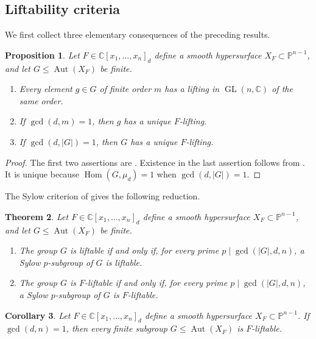\documentclass[12pt]{amsart}
\numberwithin{equation}{section}
\theoremstyle{plain}
\newtheorem{thm}{Theorem}[section]
\newtheorem{prop}[thm]{Proposition}
\newtheorem{cor}[thm]{Corollary}
\theoremstyle{definition}
\theoremstyle{remark}
\newcommand{\CC}{\mathbb C}
\newcommand{\PP}{\mathbb P}
\DeclareMathOperator{\Aut}{Aut}
\DeclareMathOperator{\GL}{GL}
\DeclareMathOperator{\Hom}{Hom}
\begin{document}
\subsection{Liftability criteria}

We first collect three elementary consequences of the preceding results.

\begin{prop}\label{prop:basic-liftability}
Let $F\in\CC[x_1,\ldots,x_n]_d$ define a smooth hypersurface
$X_F\subset\PP^{n-1}$, and let $G\leq\Aut(X_F)$ be finite.
\begin{enumerate}
    \item Every element $g\in G$ of finite order $m$ has a lifting in
    $\GL(n,\CC)$ of the same order.

    \item If $\gcd(d,m)=1$, then $g$ has a unique $F$-lifting.

    \item If $\gcd(d,|G|)=1$, then $G$ has a unique $F$-lifting.
\end{enumerate}
\end{prop}

\begin{proof}
The first two assertions are \cite[Lemma~4.1 and
Proposition~4.7]{xiezhenglift}.  Existence in the last assertion follows
from \cite[Theorem~1.3]{xiezhenglift}.  It is unique because
$\Hom(G,\mu_d)=1$ when $\gcd(d,|G|)=1$.
\end{proof}

The Sylow criterion of \cite[Theorem~1.1(2) and Theorem~1.3]{xiezhenglift} gives the following
reduction.

\begin{thm}
\label{thm:sylow-liftability}
Let $F\in\CC[x_1,\ldots,x_n]_d$ define a smooth hypersurface
$X_F\subset\PP^{n-1}$, and let $G\leq\Aut(X_F)$ be finite.
\begin{enumerate}
    \item The group $G$ is liftable if and only if, for every prime
    $p\mid\gcd(|G|,d,n)$, a Sylow $p$-subgroup of $G$ is liftable.

    \item The group $G$ is $F$-liftable if and only if, for every prime
    $p\mid\gcd(|G|,d,n)$, a Sylow $p$-subgroup of $G$ is $F$-liftable.
\end{enumerate}
\end{thm}

\begin{cor}\label{cor:coprime-liftability}
Let $F\in\CC[x_1,\ldots,x_n]_d$ define a smooth hypersurface
$X_F\subset\PP^{n-1}$.  If $\gcd(d,n)=1$, then every finite subgroup
$G\leq\Aut(X_F)$ is $F$-liftable.
\end{cor}
\end{document}

